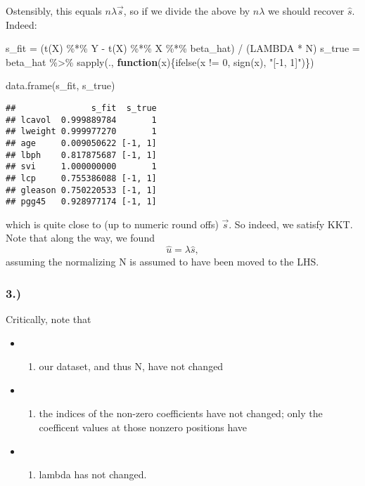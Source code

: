 \documentclass[
]{article}
\newenvironment{Shaded}{\begin{snugshade}}{\end{snugshade}}
\newcommand{\ControlFlowTok}[1]{\textcolor[rgb]{0.13,0.29,0.53}{\textbf{#1}}}
\newcommand{\DecValTok}[1]{\textcolor[rgb]{0.00,0.00,0.81}{#1}}
\newcommand{\FunctionTok}[1]{\textcolor[rgb]{0.00,0.00,0.00}{#1}}
\newcommand{\NormalTok}[1]{#1}
\newcommand{\OtherTok}[1]{\textcolor[rgb]{0.56,0.35,0.01}{#1}}
\newcommand{\SpecialCharTok}[1]{\textcolor[rgb]{0.00,0.00,0.00}{#1}}
\newcommand{\StringTok}[1]{\textcolor[rgb]{0.31,0.60,0.02}{#1}}
\providecommand{\tightlist}{%
  \setlength{\itemsep}{0pt}\setlength{\parskip}{0pt}}
\begin{document}
Ostensibly, this equals \(n\lambda \vec s\), so if we divide the above
by \(n\lambda\) we should recover \(\hat s\). Indeed:

\begin{Shaded}
\begin{Highlighting}[]
\NormalTok{s\_fit }\OtherTok{=}\NormalTok{ (}\FunctionTok{t}\NormalTok{(X) }\SpecialCharTok{\%*\%}\NormalTok{ Y }\SpecialCharTok{{-}} \FunctionTok{t}\NormalTok{(X) }\SpecialCharTok{\%*\%}\NormalTok{ X }\SpecialCharTok{\%*\%}\NormalTok{ beta\_hat) }\SpecialCharTok{/}\NormalTok{ (LAMBDA }\SpecialCharTok{*}\NormalTok{ N)}
\NormalTok{s\_true }\OtherTok{=}\NormalTok{ beta\_hat }\SpecialCharTok{\%\textgreater{}\%}
  \FunctionTok{sapply}\NormalTok{(., }\ControlFlowTok{function}\NormalTok{(x)\{}\FunctionTok{ifelse}\NormalTok{(x }\SpecialCharTok{!=} \DecValTok{0}\NormalTok{, }\FunctionTok{sign}\NormalTok{(x), }\StringTok{"[{-}1, 1]"}\NormalTok{)\})}

\FunctionTok{data.frame}\NormalTok{(s\_fit, s\_true)}
\end{Highlighting}
\end{Shaded}

\begin{verbatim}
##               s_fit  s_true
## lcavol  0.999889784       1
## lweight 0.999977270       1
## age     0.009050622 [-1, 1]
## lbph    0.817875687 [-1, 1]
## svi     1.000000000       1
## lcp     0.755386088 [-1, 1]
## gleason 0.750220533 [-1, 1]
## pgg45   0.928977174 [-1, 1]
\end{verbatim}

which is quite close to (up to numeric round offs) \(\vec s\). So
indeed, we satisfy KKT. Note that along the way, we found \[
\hat u = \lambda \hat s,
\] assuming the normalizing N is assumed to have been moved to the LHS.

\hypertarget{section-11}{%
\subsubsection{3.)}\label{section-11}}

Critically, note that

\begin{itemize}
\item
  \begin{enumerate}
  \def\labelenumi{(\roman{enumi})}
  \tightlist
  \item
    our dataset, and thus N, have not changed
  \end{enumerate}
\item
  \begin{enumerate}
  \def\labelenumi{(\roman{enumi})}
  \setcounter{enumi}{1}
  \tightlist
  \item
    the indices of the non-zero coefficients have not changed; only the
    coefficent values at those nonzero positions have
  \end{enumerate}
\item
  \begin{enumerate}
  \def\labelenumi{(\roman{enumi})}
  \setcounter{enumi}{2}
  \tightlist
  \item
    lambda has not changed.
  \end{enumerate}
\end{itemize}
\end{document}

